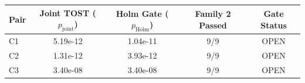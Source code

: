 \begin{tabular}{lcccc}
\toprule
Pair & Joint TOST ($p_{\mathrm{joint}}$) & Holm Gate ($p_{\mathrm{Holm}}$) & Family 2 Passed & Gate Status \\
\midrule
C1 & 5.19e-12 & 1.04e-11 & 9/9 & OPEN \\
C2 & 1.31e-12 & 3.93e-12 & 9/9 & OPEN \\
C3 & 3.40e-08 & 3.40e-08 & 9/9 & OPEN \\
\bottomrule
\end{tabular}

